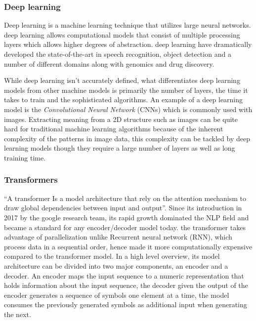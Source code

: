 \documentclass[12pt]{diazessay}
\begin{document}
        

        \subsubsection{Deep learning}
        Deep learning is a machine learning technique that utilizes large neural networks. deep learning allows computational models that consist of multiple processing layers which allows higher degrees of abstraction. deep learning have dramatically developed the state-of-the-art in speech recognition, object detection and a number of different domains along with genomics and drug discovery\cite{Hinton}. %
        
        While deep learning isn't accurately defined, what differentiates deep learning models from other machine models is primarily the number of layers, the time it takes to train and the sophisticated algorithms. An example of a deep learning model is the \emph{Convolutional Neural Network} (CNNs) which is commonly used with images. Extracting meaning from a 2D structure such as images can be quite hard for traditional machine learning algorithms because of the inherent complexity of the patterns in image data, this complexity can be tackled by deep learning models though they require a large number of layers as well as long training time.
        
        
        \subsubsection{Transformers}
        “A transformer Is a model architecture that rely on the attention mechanism to draw global dependencies between input and output”\cite{46201}. Since its introduction in 2017 by the google research team, its rapid growth dominated the NLP field and became a standard for any encoder/decoder model today\cite{wolf-etal-2020-transformers}. the transformer takes advantage of parallelization unlike Recurrent neural network (RNN), which process data in a sequential order, hence made it more computationally expensive compared to the transformer model\cite{46201}. In a high level overview, its model architecture can be divided into two major components, an encoder and a decoder. An encoder maps the input sequence to a numeric representation that holds information about the input sequence, the decoder given the output of the encoder generates a sequence of symbols one element at a time, the model consumes the previously generated symbols as additional input when generating the next\cite{46201}.
\end{document}
